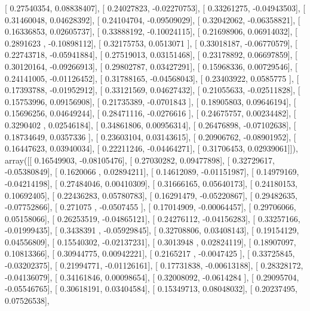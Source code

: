 \documentclass{article}
\begin{document}
       [ 0.27540354,  0.08838407],
       [ 0.24027823, -0.02270753],
       [ 0.33261275, -0.04943503],
       [ 0.31460048,  0.04628392],
       [ 0.24104704, -0.09509029],
       [ 0.32042062, -0.06358821],
       [ 0.16336853,  0.02605737],
       [ 0.33888192, -0.10024115],
       [ 0.21698906,  0.06914032],
       [ 0.2891623 , -0.10898112],
       [ 0.32175753,  0.0513071 ],
       [ 0.33018187, -0.06770579],
       [ 0.22743718, -0.05941884],
       [ 0.27519013,  0.03151468],
       [ 0.23178892,  0.06697859],
       [ 0.30120164, -0.09266913],
       [ 0.29802787,  0.03427291],
       [ 0.15968336,  0.00729546],
       [ 0.24141005, -0.01126452],
       [ 0.31788165, -0.04568043],
       [ 0.23403922,  0.0585775 ],
       [ 0.17393788, -0.01952912],
       [ 0.33121569,  0.04627432],
       [ 0.21055633, -0.02511828],
       [ 0.15753996,  0.09156908],
       [ 0.21735389, -0.0701843 ],
       [ 0.18905803,  0.09646194],
       [ 0.15696256,  0.04649244],
       [ 0.28471116, -0.0276616 ],
       [ 0.24675757,  0.00234482],
       [ 0.3290402 ,  0.02546184],
       [ 0.34861806,  0.00956314],
       [ 0.26476898, -0.07102638],
       [ 0.18734649,  0.0357336 ],
       [ 0.23603104,  0.03143615],
       [ 0.20906762, -0.08901952],
       [ 0.16447623,  0.03940034],
       [ 0.22211246, -0.04464271],
       [ 0.31706453,  0.02939061]]), array([[ 0.16549903, -0.08105476],
       [ 0.27030282,  0.09477898],
       [ 0.32729617, -0.05380849],
       [ 0.1620066 ,  0.02894211],
       [ 0.14612089, -0.01151987],
       [ 0.14979169, -0.04214198],
       [ 0.27484046,  0.00410309],
       [ 0.31666165,  0.05640173],
       [ 0.24180153,  0.10692405],
       [ 0.22436283,  0.05780783],
       [ 0.16291479, -0.05220867],
       [ 0.29482635, -0.07752866],
       [ 0.271075  , -0.0507455 ],
       [ 0.17014909, -0.00064457],
       [ 0.29706066,  0.05158066],
       [ 0.26253519, -0.04865121],
       [ 0.24276112, -0.04156283],
       [ 0.33257166, -0.01999435],
       [ 0.3438391 , -0.05929845],
       [ 0.32708806,  0.03408143],
       [ 0.19154129,  0.04556809],
       [ 0.15540302, -0.02137231],
       [ 0.3013948 ,  0.02824119],
       [ 0.18907097,  0.10813366],
       [ 0.30944775,  0.00942221],
       [ 0.2165217 , -0.0047425 ],
       [ 0.33725845, -0.03202375],
       [ 0.21994771, -0.01126161],
       [ 0.17731838, -0.00613188],
       [ 0.28328172, -0.04136079],
       [ 0.34161846,  0.00098654],
       [ 0.32008092, -0.0614284 ],
       [ 0.29095704, -0.05546765],
       [ 0.30618191,  0.03404584],
       [ 0.15349713,  0.08048032],
       [ 0.20237495,  0.07526538],
\end{document}

